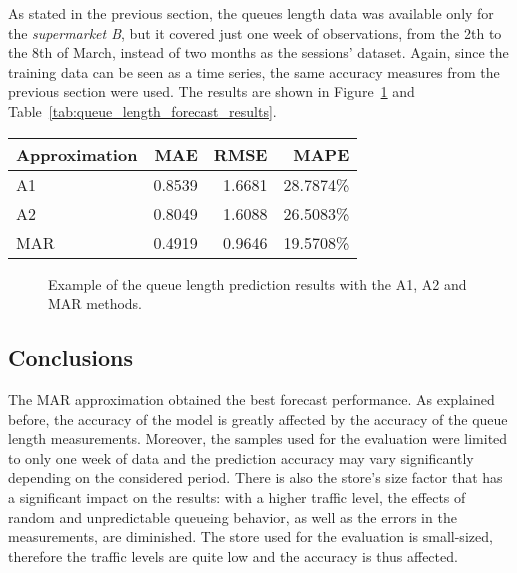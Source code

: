 As stated in the previous section, the queues length data was available only for the \emph{supermarket B}, but it covered just one week of observations, from the 2th to the 8th of March, instead of two months as the sessions' dataset. Again, since the training data can be seen as a time series, the same accuracy measures from the previous section were used. The results are shown in Figure~\ref{fig:queue_length_forecast} and Table~\ref{tab:queue_length_forecast_results}.

\begin{center}
  \begin{tabular}{ l r r r }
    \hline
    Approximation & MAE    & RMSE   & MAPE      \\
    \hline
    A1            & 0.8539 & 1.6681 & 28.7874\% \\
    A2            & 0.8049 & 1.6088 & 26.5083\% \\
    MAR           & 0.4919 & 0.9646 & 19.5708\% \\
    \hline
  \end{tabular}
\end{center}

\begin{figure}
  \begin{center}
  \end{center}
  \caption{Example of the queue length prediction results with the A1, A2 and MAR methods.}
  \label{fig:queue_length_forecast}
\end{figure}

\subsection{Conclusions}
\label{subsec:queue_length_forecast_results_conclusions}

The MAR approximation obtained the best forecast performance. As explained before, the accuracy of the model is greatly affected by the accuracy of the queue length measurements. Moreover, the samples used for the evaluation were limited to only one week of data and the prediction accuracy may vary significantly depending on the considered period. There is also the store’s size factor that has a significant impact on the results: with a higher traffic level, the effects of random and unpredictable queueing behavior, as well as the errors in the measurements, are diminished. The store used for the evaluation is small-sized, therefore the traffic levels are quite low and the accuracy is thus affected.

\medskip
\clearpage